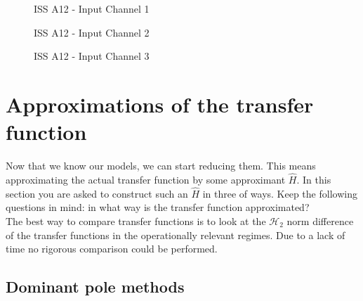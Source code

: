 \documentclass{article}
\newlength\figurewidth
\begin{document}
	
	\begin{figure}[h!]
		\centering
		\setlength{\figurewidth}{2\textwidth}
		
		\caption{ISS A12 - Input Channel 1}\label{fig:bode-iss1}
	\end{figure}
	\begin{figure}[h!]
		\centering
		\setlength{\figurewidth}{2\textwidth}
		
		\caption{ISS A12 - Input Channel 2}\label{fig:bode-iss2}
	\end{figure}
	\begin{figure}[h!]
		\centering
		\setlength{\figurewidth}{2\textwidth}
		
		\caption{ISS A12 - Input Channel 3}\label{fig:bode-iss3}
	\end{figure}
	
	\FloatBarrier
	\section{Approximations of the transfer function}
	Now that we know our models, we can start reducing them. This means approximating the actual transfer function by some approximant $\hat{H}$. In this section you are asked to construct such an $\hat{H}$ in three of ways. Keep the following questions in mind: in what way is the transfer function approximated? \\
	The best way to compare transfer functions is to look at the $\mathcal{H}_2$ norm difference of the transfer functions in the operationally relevant regimes. Due to a lack of time no rigorous comparison could be performed.
	\subsection{Dominant pole methods}
\end{document}
